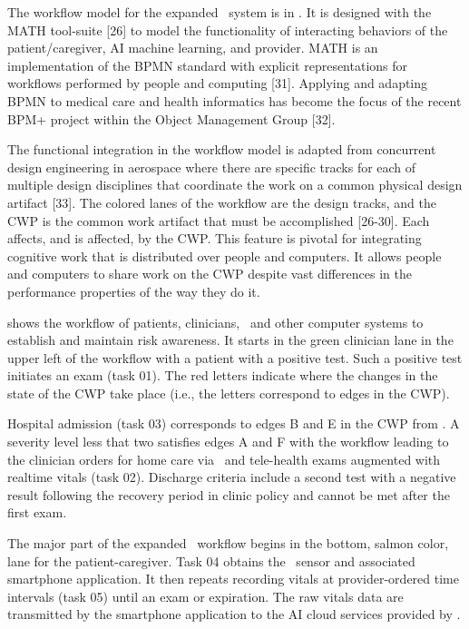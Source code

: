 The workflow model for the expanded \phware\ system is in . It is designed with the MATH tool-suite [26] to model the functionality of interacting behaviors of the patient/caregiver, AI machine learning, and provider. MATH is an implementation of the BPMN standard with explicit representations for workflows performed by people and computing [31]. Applying and adapting BPMN to medical care and health informatics has become the focus of the recent BPM+ project within the Object Management Group [32]. 

The functional integration in the workflow model is adapted from concurrent design engineering in aerospace where there are specific tracks for each of multiple design disciplines that coordinate the work on a common physical design artifact [33]. The colored lanes of the workflow are the design tracks, and the CWP is the common work artifact that must be accomplished [26-30]. Each affects, and is affected, by the CWP. This feature is pivotal for integrating cognitive work that is distributed over people and computers. It allows people and computers to share work on the CWP despite vast differences in the performance properties of the way they do it. 

 shows the workflow of patients, clinicians, \phware\ and other computer systems to establish and maintain risk awareness. It starts in the green clinician lane in the upper left of the workflow with a patient with a positive test. Such a positive test initiates an exam (task 01). The red letters indicate where the changes in the state of the CWP take place (i.e., the letters correspond to edges in the CWP). 

Hospital admission (task 03) corresponds to edges B and E in the CWP from . A severity level less that two satisfies edges A and F with the workflow leading to the clinician orders for home care via \phware\ and tele-health exams augmented with realtime vitals (task 02). Discharge criteria include a second test with a negative result following the recovery period in clinic policy and cannot be met after the first exam.

The major part of the expanded \phware\ workflow begins in the bottom, salmon color, lane for the patient-caregiver. Task 04 obtains the \phware\ sensor and associated smartphone application. It then repeats recording vitals at provider-ordered time intervals (task 05) until an exam or expiration. The raw vitals data are transmitted by the smartphone application to the AI cloud services provided by \phware. 

